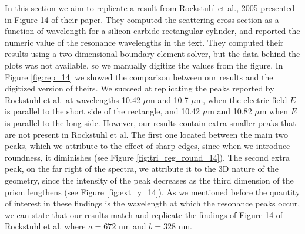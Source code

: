 In this section we aim to replicate a result from Rockstuhl et al., 2005 \cite{rockstuhl2005} presented in Figure 14 of their paper. 
They computed the scattering cross-section as a function of wavelength for a silicon carbide rectangular cylinder, and reported the
numeric value of the resonance wavelengths in the text. They computed their results using a two-dimensional boundary element solver, 
but the data behind the plots was not available, so we manually digitize the values from the figure. In Figure \ref{fig:rep_14} we 
showed the comparison between our results and the digitized version of theirs. We succeed at replicating the peaks reported by 
Rockstuhl et al.\ at wavelengths 10.42 $\mu$m and 10.7 $\mu$m,  when the electric field $E$ is parallel to the short side of 
the rectangle, and 10.42 $\mu$m and 10.82 $\mu$m when $E$ is parallel to the long side. However, our results contain extra smaller peaks 
that are not present in Rockstuhl et al. The first one located between the main two peaks, which we attribute to the effect of sharp edges, 
since when we introduce roundness, it diminishes (see Figure \ref{fig:tri_reg_round_14}). The second extra peak, on the far right of the spectra, 
we attribute it to the 3D nature of the geometry, since the intensity of the peak decreases as the third dimension of the prism lengthens
(see Figure \ref{fig:ext_y_14}). As we mentioned before the quantity of interest in these findings is the wavelength at which the resonance peaks
occur, we can state that our results match and replicate the findings of Figure 14 of Rockstuhl et al. where $a = 672$ nm and $b = 328$ nm.
